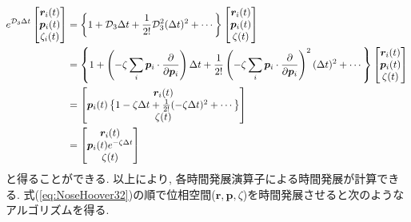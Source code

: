 \begin{align}
 e^{\mathcal{D}_{3} \Delta t}
 \begin{bmatrix}
  \bm{r}_{i} (t) \\
  \bm{p}_{i} (t) \\
  \zeta_{i} (t) \\
 \end{bmatrix}
 &= \left\{
    1 + \mathcal{D}_{3} \Delta t
    + \frac{1}{2!} \mathcal{D}_{3}^{2} (\Delta t)^{2}
    + \cdots
    \right\}
 \begin{bmatrix}
  \bm{r}_{i} (t) \\
  \bm{p}_{i} (t) \\
  \zeta (t) \\
 \end{bmatrix}
 \notag \\
 &= \left\{
    1
    + \left(
      -\zeta \sum_{i} \bm{p}_{i}\cdot \frac{\partial}{\partial \bm{p}_{i}}
      \right)
    \Delta t
    + \frac{1}{2!}
      \left(
      -\zeta \sum_{i} \bm{p}_{i}\cdot \frac{\partial}{\partial \bm{p}_{i}}
      \right)^{2}
      (\Delta t)^{2}
    + \cdots
    \right\}
 \begin{bmatrix}
  \bm{r}_{i} (t) \\
  \bm{p}_{i} (t) \\
  \zeta (t) \\
 \end{bmatrix}
 \notag \\
 &=
 \begin{bmatrix}
  \bm{r}_{i} (t) \\
  \bm{p}_{i} (t)
  \left\{
  1 - \zeta \Delta t + \frac{1}{2!} (-\zeta \Delta t)^{2} + \cdots
  \right\} \\
  \zeta (t) \\
 \end{bmatrix}
 \notag \\
 &=
 \begin{bmatrix}
  \bm{r}_{i} (t) \\
  \bm{p}_{i} (t) e^{- \zeta \Delta t} \\
  \zeta (t) \\
 \end{bmatrix}
 \label{eq:NoseHoover36}
\end{align}
と得ることができる.
以上により, 各時間発展演算子による時間発展が計算できる.
式(\ref{eq:NoseHoover32})の順で位相空間($\bm{r},\bm{p},\zeta$)を時間発展させると次のようなアルゴリズムを得る.

